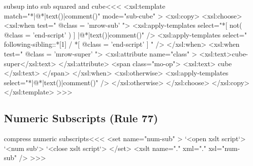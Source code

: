 \documentclass{article}
\begin{document}
\<subsup into sub squared and cube\><<<
<xsl:template match="*|@*|text()|comment()" 
                           mode="sub-cube" >
   <xsl:copy>
     <xsl:choose>
        <xsl:when test=" @class = 'mrow-sub' ">
           <xsl:apply-templates select="*[
                       not( @class = 'end-script' )
                     ]
                           |@*|text()|comment()" />
           <xsl:apply-templates select="
               following-sibling::*[1] / *[
                        @class = 'end-script' 
                  ] " />
        </xsl:when>  
        <xsl:when test=" @class = 'mrow-super' ">
           <xsl:attribute name="class" >
               <xsl:text>cube-super</xsl:text>
           </xsl:attribute>
           <span class="mo-op">
             <xsl:text> cube </xsl:text>
           </span>
        </xsl:when>  
        <xsl:otherwise>
           <xsl:apply-templates select="*|@*|text()|comment()" />
        </xsl:otherwise>
     </xsl:choose>
   </xsl:copy>
</xsl:template> 
>>>



\subsection{Numeric Subscripts (Rule 77)}

\<compress numeric subscripts\><<<
  <set name="num-sub" >
     `<open xslt script`>
     `<num sub`> 
     `<close xslt script`>
  </set>
  <xslt name="." xml="." xsl="num-sub" />
>>>
\end{document}
